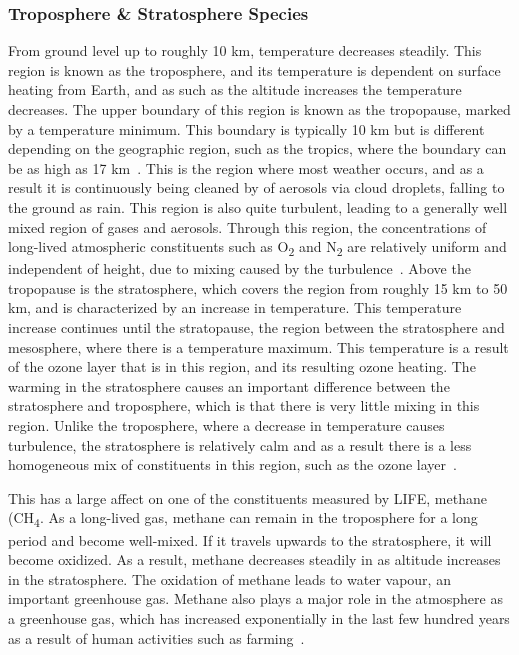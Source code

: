 \subsubsection{Troposphere \& Stratosphere Species}
From ground level up to roughly 10 km, temperature decreases steadily. This region is known as the troposphere, and its temperature is dependent on surface heating from Earth, and as such as the altitude increases the temperature decreases. The upper boundary of this region is known as the tropopause, marked by a temperature minimum. This boundary is typically 10 km but is different depending on the geographic region, such as the tropics, where the boundary can be as high as 17 km~\citep{ext_utls}. This is the region where most weather occurs, and as a result it is continuously being cleaned by of aerosols via cloud droplets, falling to the ground as rain. This region is also quite turbulent, leading to a generally well mixed region of gases and aerosols. Through this region, the concentrations of long-lived atmospheric constituents such as O\textsubscript{2} and N\textsubscript{2} are relatively uniform and independent of height, due to mixing caused by the turbulence~\citep{atmos_phys_and_climate}.
Above the tropopause is the stratosphere, which covers the region from roughly 15 km to 50 km, and is characterized by an increase in temperature. This temperature increase continues until the stratopause, the region between the stratosphere and mesosphere, where there is a temperature maximum. This temperature is a result of the ozone layer that is in this region, and its resulting ozone heating. The warming in the stratosphere causes an important difference between the stratosphere and troposphere, which is that there is very little mixing in this region. Unlike the troposphere, where a decrease in temperature causes turbulence, the stratosphere is relatively calm and as a result there is a less homogeneous mix of constituents in this region, such as the ozone layer~\citep{atmos_science}. 

 This has a large affect on one of the constituents measured by LIFE, methane (CH\textsubscript{4}. As a long-lived gas, methane can remain in the troposphere for a long period and become well-mixed. If it travels upwards to the stratosphere, it will become oxidized. As a result, methane decreases steadily in as altitude increases in the stratosphere. The oxidation of methane leads to water vapour, an important greenhouse gas. Methane also plays a major role in the atmosphere as a greenhouse gas, which has increased exponentially in the last few hundred years as a result of human activities such as farming~\citep{atmos_phys_and_climate}. 

